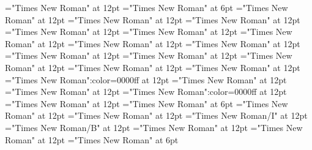 \documentclass[a4paper]{article}
\begin{document}
 
\pagestyle{plain} 
\font\spanParagraphContinuationscrSectioncolumnsscrBookscrBody="Times New Roman" at 12pt
\font\VerseNumberParagraphContinuationscrSectioncolumnsscrBookscrBody="Times New Roman" at 6pt
\font\ParagraphContinuationscrSectioncolumnsscrBookscrBody="Times New Roman" at 12pt
\font\spanreferenceafterpictureCaptionpictureColumnParagraphscrSectioncolumnsscrBookscrBody="Times New Roman" at 12pt
\font\spanreferencebeforepictureCaptionpictureColumnParagraphscrSectioncolumnsscrBookscrBody="Times New Roman" at 12pt
\font\spanpictureCaptionpictureColumnParagraphscrSectioncolumnsscrBookscrBody="Times New Roman" at 12pt
\font\pictureCaptionpictureColumnParagraphscrSectioncolumnsscrBookscrBody="Times New Roman" at 12pt
\font\picturepictureColumnParagraphscrSectioncolumnsscrBookscrBody="Times New Roman" at 12pt
\font\pictureColumnParagraphscrSectioncolumnsscrBookscrBody="Times New Roman" at 12pt
\font\spanreferenceafterpictureCaptionpicturePageParagraphscrSectioncolumnsscrBookscrBody="Times New Roman" at 12pt
\font\spanreferencebeforepictureCaptionpicturePageParagraphscrSectioncolumnsscrBookscrBody="Times New Roman" at 12pt
\font\spanpictureCaptionpicturePageParagraphscrSectioncolumnsscrBookscrBody="Times New Roman" at 12pt
\font\pictureCaptionpicturePageParagraphscrSectioncolumnsscrBookscrBody="Times New Roman" at 12pt
\font\picturepicturePageParagraphscrSectioncolumnsscrBookscrBody="Times New Roman" at 12pt
\font\picturePageParagraphscrSectioncolumnsscrBookscrBody="Times New Roman" at 12pt
\font\SeeInGlossaryParagraphscrSectioncolumnsscrBookscrBody="Times New Roman":color=0000ff at 12pt
\font\spanLinecscrSectioncolumnsscrBookscrBody="Times New Roman" at 12pt
\font\LinecscrSectioncolumnsscrBookscrBody="Times New Roman" at 12pt
\font\SeeInGlossaryLinebscrSectioncolumnsscrBookscrBody="Times New Roman":color=0000ff at 12pt
\font\spanLinebscrSectioncolumnsscrBookscrBody="Times New Roman" at 12pt
\font\VerseNumberLinebscrSectioncolumnsscrBookscrBody="Times New Roman" at 6pt
\font\LinebscrSectioncolumnsscrBookscrBody="Times New Roman" at 12pt
\font\spanNoteGeneralParagraphParagraphscrSectioncolumnsscrBookscrBody="Times New Roman" at 12pt
\font\AlternateReadingNoteGeneralParagraphParagraphscrSectioncolumnsscrBookscrBody="Times New Roman/I" at 12pt
\font\NoteTargetReferenceNoteGeneralParagraphParagraphscrSectioncolumnsscrBookscrBody="Times New Roman/B" at 12pt
\font\NoteGeneralParagraphParagraphscrSectioncolumnsscrBookscrBody="Times New Roman" at 12pt
\font\spanParagraphscrSectioncolumnsscrBookscrBody="Times New Roman" at 12pt
\font\VerseNumberParagraphscrSectioncolumnsscrBookscrBody="Times New Roman" at 6pt
\end{document}
